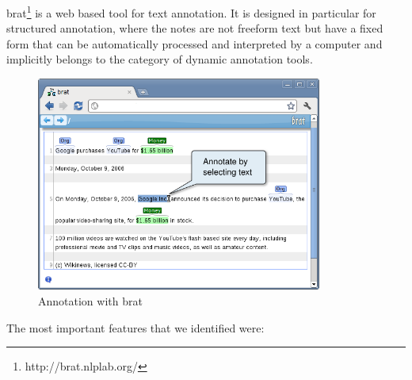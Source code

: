 brat\footnote{http://brat.nlplab.org/} is a web based tool for text annotation. It is
designed in particular for structured annotation, where the notes are not freeform text
but have a fixed form that can be automatically processed and interpreted by a computer
and implicitly belongs to the category of dynamic annotation tools.
\begin{figure}[ht]
 \includegraphics[width=3.7in]{figures/brat}
 \caption{Annotation with brat}\label{fig:brat}
\end{figure}
The most important features that we identified were:
